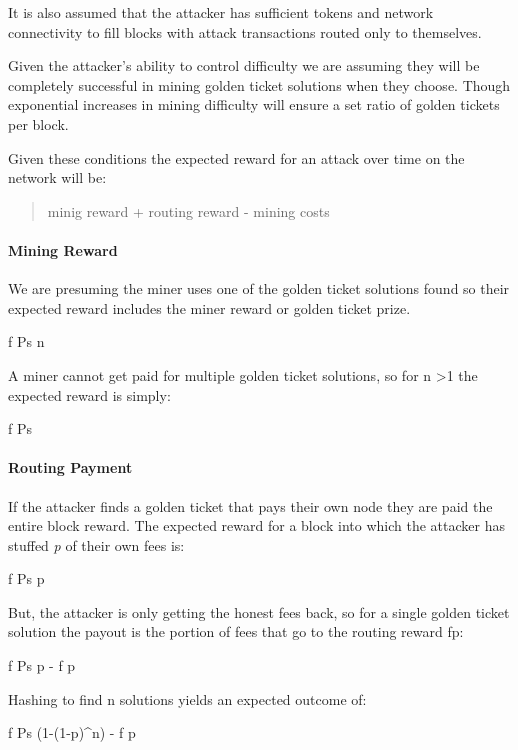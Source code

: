 \documentclass[
]{article}
\begin{document}
It is also assumed that the attacker has sufficient tokens and network
connectivity to fill blocks with attack transactions routed only to
themselves.

Given the attacker's ability to control difficulty we are assuming they
will be completely successful in mining golden ticket solutions when
they choose. Though exponential increases in mining difficulty will
ensure a set ratio of golden tickets per block.

Given these conditions the expected reward for an attack over time on
the network will be:

\begin{quote}
minig reward + routing reward - mining costs
\end{quote}

\hypertarget{mining-reward}{%
\paragraph{Mining Reward}\label{mining-reward}}

We are presuming the miner uses one of the golden ticket solutions found
so their expected reward includes the miner reward or golden ticket
prize.

f \cdot Ps \cdot n

A miner cannot get paid for multiple golden ticket solutions, so for n
\textgreater1 the expected reward is simply:

f \cdot Ps

\hypertarget{routing-payment}{%
\paragraph{Routing Payment}\label{routing-payment}}

If the attacker finds a golden ticket that pays their own node they are
paid the entire block reward. The expected reward for a block into which
the attacker has stuffed \emph{p} of their own fees is:

f \cdot Ps \cdot p

But, the attacker is only getting the honest fees back, so for a single
golden ticket solution the payout is the portion of fees that go to the
routing reward f\cdot p:

f \cdot Ps \cdot p - f \cdot p

Hashing to find n solutions yields an expected outcome of:

f \cdot Ps \cdot (1-(1-p)\^{}n) - f \cdot p
\end{document}
